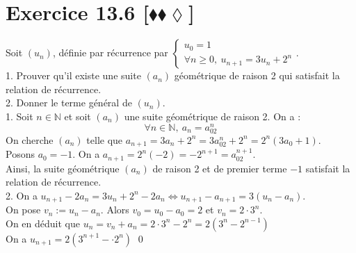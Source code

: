 \documentclass[10pt]{article}
\begin{document}
\section*{Exercice 13.6 [$\blacklozenge\blacklozenge\lozenge$]}
\begin{tcolorbox}[enhanced, width=7.6in, center, size=fbox, fontupper=\large, drop shadow southwest]
    Soit $(u_n)$, définie par récurrence par $\begin{cases}u_0=1\\\forall n \geq 0, ~ u_{n+1} = 3u_n + 2^n\end{cases}$.\\
    1. Prouver qu'il existe une suite $(a_n)$ géométrique de raison 2 qui satisfait la relation de récurrence.\\
    2. Donner le terme général de $(u_n)$.\\[0.1cm]
    1. Soit $n\in\mathbb{N}$ et soit $(a_n)$ une suite géométrique de raison 2. On a :
    \begin{equation*}
        \forall n\in\mathbb{N}, ~ a_n = a_02^{n}
    \end{equation*}
    On cherche $(a_n)$ telle que $a_{n+1} = 3a_n + 2^n = 3a_02^n+2^n = 2^n(3a_0+1)$.\\
    Posons $a_0 = -1$. On a $a_{n+1} = 2^n(-2) = -2^{n+1} = a_02^{n+1}$.\\
    Ainsi, la suite géométrique $(a_n)$ de raison 2 et de premier terme $-1$ satisfait la relation de récurrence.\\
    2. On a $u_{n+1} - 2a_n = 3u_n + 2^n - 2a_n \iff u_{n+1} - a_{n+1} = 3(u_n - a_n)$.\\
    On pose $v_n := u_n - a_n$. Alors $v_0 = u_0 - a_0 = 2$ et $v_n = 2\cdot3^n$.\\
    On en déduit que $u_n = v_n + a_n = 2\cdot3^n - 2^n = 2(3^n - 2^{n-1})$\\
    On a $u_{n+1} = 2(3^{n+1} - \cdot2^{n})$ \qed
\end{tcolorbox}

\end{document}
